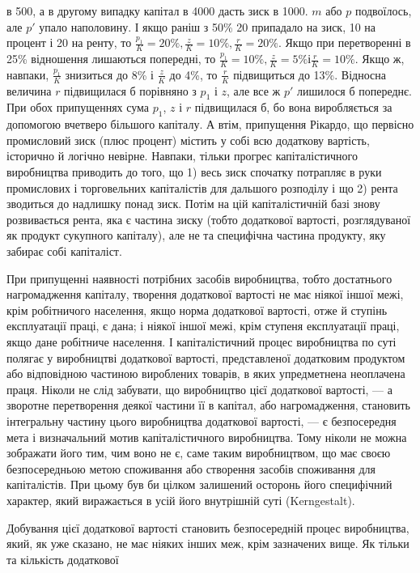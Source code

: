 \parcont{}  %
в 500, а в другому випадку капітал в 4000 дасть зиск в 1000.
$m$ або $p$ подвоїлось, але $p'$ упало наполовину. І якщо раніш
з 50\% 20 припадало на зиск, 10 на процент і 20 на ренту, то
$\frac{p_1}{K} = 20\%, \frac{z}{K} = 10\%, \frac{r}{K} = 20\%$. Якщо при перетворенні в 25\%
відношення лишаються попередні, то $\frac{p_1}{K} = 10\%, \frac{z}{K} = 5\% і \frac{r}{K} = 10\%$.
Якщо ж, навпаки, $\frac{p_1}{K}$ знизиться до 8\% і $\frac{z}{K}$ до 4\%, то $\frac{r}{K}$
підвищиться до 13\%. Відносна величина $r$ підвищилася б порівняно
з $p_1$ і $z$, але все ж $p'$ лишилося б попереднє. При обох припущеннях
сума $p_1$, $z$ і $r$ підвищилася б, бо вона виробляється
за допомогою вчетверо більшого капіталу. А втім, припущення
Рікардо, що первісно промисловий зиск (плюс процент) містить
у собі всю додаткову вартість, історично й логічно невірне.
Навпаки, тільки прогрес капіталістичного виробництва приводить
до того, що 1) весь зиск спочатку потрапляє в руки промислових
і торговельних капіталістів для дальшого розподілу
і що 2) рента зводиться до надлишку понад зиск. Потім на цій
капіталістичній базі знову розвивається рента, яка є частина зиску
(тобто додаткової вартості, розглядуваної як продукт сукупного
капіталу), але не та специфічна частина продукту, яку забирає
собі капіталіст.

При припущенні наявності потрібних засобів виробництва,
тобто достатнього нагромадження капіталу, творення додаткової
вартості не має ніякої іншої межі, крім робітничого населення,
якщо норма додаткової вартості, отже й ступінь експлуатації
праці, є дана; і ніякої іншої межі, крім ступеня експлуатації
праці, якщо дане робітниче населення. І капіталістичний
процес виробництва по суті полягає у виробництві додаткової
вартості, представленої додатковим продуктом або відповідною
частиною вироблених товарів, в яких упредметнена неоплачена
праця. Ніколи не слід забувати, що виробництво цієї додаткової
вартості, — а зворотне перетворення деякої частини її в капітал,
або нагромадження, становить інтегральну частину цього виробництва
додаткової вартості, — є безпосередня мета і визначальний
мотив капіталістичного виробництва. Тому ніколи не можна зображати
його тим, чим воно не є, саме таким виробництвом, що має
своєю безпосередньою метою споживання або створення засобів
споживання для капіталістів. При цьому був би цілком
залишений осторонь його специфічний характер, який виражається
в усій його внутрішній суті (Kerngestalt).

Добування цієї додаткової вартості становить безпосередній
процес виробництва, який, як уже сказано, не має ніяких інших
меж, крім зазначених вище. Як тільки та кількість додаткової
\parbreak{}  %
